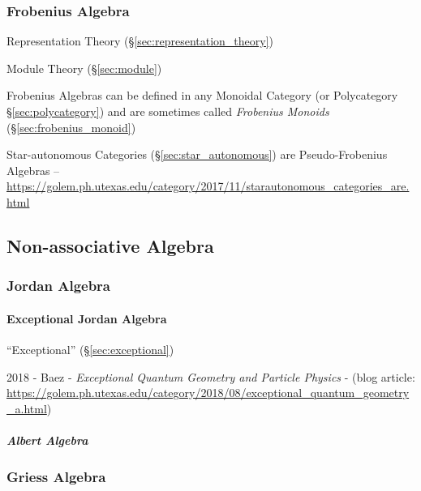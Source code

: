\subsubsection{Frobenius Algebra}\label{sec:frobenius_algebra}

Representation Theory (\S\ref{sec:representation_theory})

Module Theory (\S\ref{sec:module})

Frobenius Algebras can be defined in any Monoidal Category (or
Polycategory \S\ref{sec:polycategory}) and are sometimes called
\emph{Frobenius Monoids} (\S\ref{sec:frobenius_monoid})

Star-autonomous Categories (\S\ref{sec:star_autonomous}) are Pseudo-Frobenius
Algebras
--\url{https://golem.ph.utexas.edu/category/2017/11/starautonomous_categories_are.html}



\subsection{Non-associative Algebra}
\label{sec:nonassociative_algebra}

\subsubsection{Jordan Algebra}\label{sec:jordan_algebra}

\paragraph{Exceptional Jordan Algebra}\label{sec:exceptional_jordan_algebra}
\hfill

``Exceptional'' (\S\ref{sec:exceptional})

2018 - Baez - \emph{Exceptional Quantum Geometry and Particle Physics} - (blog
article:
\url{https://golem.ph.utexas.edu/category/2018/08/exceptional_quantum_geometry_a.html})



\subparagraph{Albert Algebra}\label{sec:albert_algebra}\hfill



\subsubsection{Griess Algebra}\label{sec:griess_algebra}

